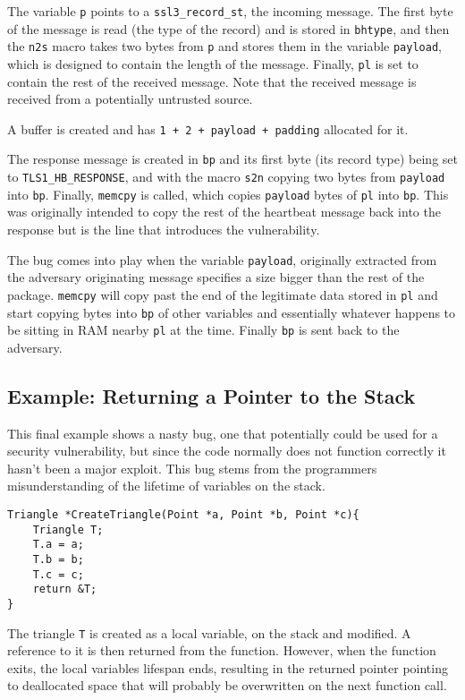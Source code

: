 The variable \verb!p! points to a \verb!ssl3_record_st!, the incoming message.
The first byte of the message is read (the type of the record) and is stored in \verb!bhtype!, and then the \verb!n2s! macro takes two bytes from \verb!p! and stores them in the variable \verb!payload!, which is designed to contain the length of the message.
Finally, \verb!pl! is set to contain the rest of the received message.
Note that the received message is received from a potentially untrusted source.

A buffer is created and has \verb!1 + 2 + payload + padding! allocated for it.

The response message is created in \verb!bp! and its first byte (its record type) being set to \verb!TLS1_HB_RESPONSE!, and with the macro \verb!s2n! copying two bytes from \verb!payload! into \verb!bp!.
Finally, \verb!memcpy! is called, which copies \verb!payload! bytes of \verb!pl! into \verb!bp!.
This was originally intended to copy the rest of the heartbeat message back into the response but is the line that introduces the vulnerability.

The bug comes into play when the variable \verb!payload!, originally extracted from the adversary originating message specifies a size bigger than the rest of the package.
\verb!memcpy! will copy past the end of the legitimate data stored in \verb!pl! and start copying bytes into \verb!bp! of other variables and essentially whatever happens to be sitting in RAM nearby \verb!pl! at the time.
Finally \verb!bp! is sent back to the adversary.


\subsection{Example: Returning a Pointer to the Stack}
This final example shows a nasty bug, one that potentially could be used for a security vulnerability, but since the code normally does not function correctly it hasn't been a major exploit.
This bug stems from the programmers misunderstanding of the lifetime of variables on the stack.

\begin{verbatim}
Triangle *CreateTriangle(Point *a, Point *b, Point *c){
    Triangle T;
    T.a = a;
	T.b = b;
    T.c = c;
    return &T;
}
\end{verbatim}

The triangle \verb!T! is created as a local variable, on the stack and modified.
A reference to it is then returned from the function.
However, when the function exits, the local variables lifespan ends, resulting in the returned pointer pointing to deallocated space that will probably be overwritten on the next function call.

